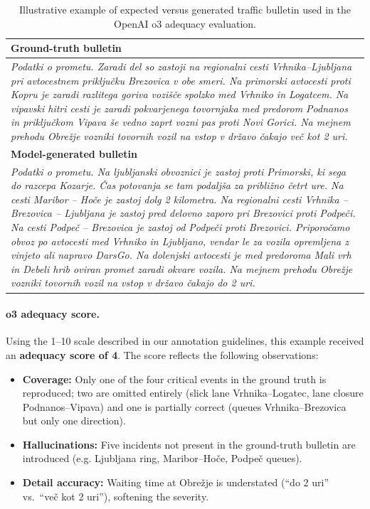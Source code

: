 \documentclass[fleqn,moreauthors,10pt]{ds_report}
\begin{document}
\begin{table}[ht]
\centering
\footnotesize                    %
\renewcommand{\arraystretch}{1.15}
\setlength{\tabcolsep}{4pt}
\begin{tabularx}{\linewidth}{@{}X@{}}
\toprule
\textbf{Ground-truth bulletin} \\  %
\midrule
\textit{Podatki o prometu. Zaradi del so zastoji na regionalni cesti Vrhnika–Ljubljana pri avtocestnem priključku Brezovica v obe smeri. Na primorski avtocesti proti Kopru je zaradi razlitega goriva vozišče spolzko med Vrhniko in Logatcem. Na vipavski hitri cesti je zaradi pokvarjenega tovornjaka med predorom Podnanos in priključkom Vipava še vedno zaprt vozni pas proti Novi Gorici. Na mejnem prehodu Obrežje vozniki tovornih vozil na vstop v državo čakajo več kot 2 uri.} \\[0.8em] %
\midrule

\textbf{Model-generated bulletin} \\  %
\midrule
\textit{Podatki o prometu. Na ljubljanski obvoznici je zastoj proti Primorski, ki sega do razcepa Kozarje. Čas potovanja se tam podaljša za približno četrt ure. Na cesti Maribor – Hoče je zastoj dolg 2 kilometra. Na regionalni cesti Vrhnika – Brezovica – Ljubljana je zastoj pred delovno zaporo pri Brezovici proti Podpeči. Na cesti Podpeč – Brezovica je zastoj od Podpeči proti Brezovici. Priporočamo obvoz po avtocesti med Vrhniko in Ljubljano, vendar le za vozila opremljena z vinjeto ali napravo DarsGo. Na dolenjski avtocesti je med predoroma Mali vrh in Debeli hrib oviran promet zaradi okvare vozila. Na mejnem prehodu Obrežje vozniki tovornih vozil na vstop v državo čakajo do 2 uri.} \\
\bottomrule
\end{tabularx}
\caption{Illustrative example of expected versus generated traffic bulletin used in the OpenAI o3 adequacy evaluation.}
\label{tab:qualitative}
\end{table}

\paragraph{o3 adequacy score.}  
Using the 1–10 scale described in our annotation guidelines, this example received an \textbf{adequacy score of 4}.  The score reflects the following observations:

\begin{itemize}
  \item \textbf{Coverage:} Only one of the four critical events in the ground truth is reproduced; two are omitted entirely (slick lane Vrhnika–Logatec, lane closure Podnanos–Vipava) and one is partially correct (queues Vrhnika–Brezovica but only one direction).
  \item \textbf{Hallucinations:} Five incidents not present in the ground-truth bulletin are introduced (e.g. Ljubljana ring, Maribor–Hoče, Podpeč queues).
  \item \textbf{Detail accuracy:} Waiting time at Obrežje is understated (“do 2 uri” vs.\ “več kot 2 uri”), softening the severity.
\end{itemize}
\end{document}
